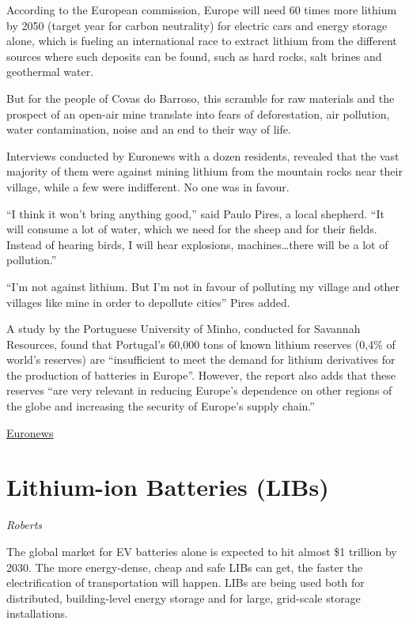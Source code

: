 \documentclass[
]{book}
\begin{document}
According to the European commission, Europe will need 60 times more lithium by 2050 (target year for carbon neutrality) for electric cars and energy storage alone, which is fueling an international race to extract lithium from the different sources where such deposits can be found, such as hard rocks, salt brines and geothermal water.

But for the people of Covas do Barroso, this scramble for raw materials and the prospect of an open-air mine translate into fears of deforestation, air pollution, water contamination, noise and an end to their way of life.

Interviews conducted by Euronews with a dozen residents, revealed that the vast majority of them were against mining lithium from the mountain rocks near their village, while a few were indifferent. No one was in favour.

``I think it won't bring anything good,'' said Paulo Pires, a local shepherd. ``It will consume a lot of water, which we need for the sheep and for their fields. Instead of hearing birds, I will hear explosions, machines\ldots there will be a lot of pollution.''

``I'm not against lithium. But I'm not in favour of polluting my village and other villages like mine in order to depollute cities'' Pires added.

A study by the Portuguese University of Minho, conducted for Savannah Resources, found that Portugal's 60,000 tons of known lithium reserves (0,4\% of world's reserves) are ``insufficient to meet the demand for lithium derivatives for the production of batteries in Europe''. However, the report also adds that these reserves ``are very relevant in reducing Europe's dependence on other regions of the globe and increasing the security of Europe's supply chain.''

\href{https://www.euronews.com/2021/04/23/portuguese-village-suffers-the-high-cost-of-low-carbon-energy}{Euronews}

\hypertarget{lithium-ion-batteries-libs}{%
\section{Lithium-ion Batteries (LIBs)}\label{lithium-ion-batteries-libs}}

\emph{Roberts}

The global market for EV batteries alone is expected to hit almost \$1 trillion by 2030.
The more energy-dense, cheap and safe LIBs can get, the faster the electrification of transportation will happen.
LIBs are being used both for distributed, building-level energy storage and for large, grid-scale storage installations.
\end{document}
